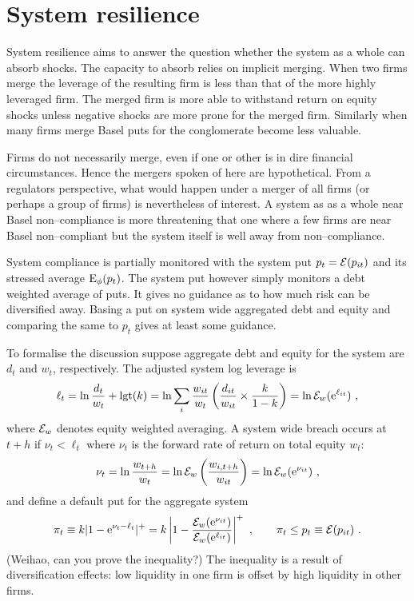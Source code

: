 \documentclass[authoryear]{elsarticle}
\newcommand{\logit}{\mathrm{lgt}}
\newcommand{\e}{\mathrm{e}}
\newcommand{\Ex}{{\cal E}}
\newcommand{\cq}{\ , \qquad}
\newcommand{\be}[1]{\begin{equation}\label{#1}}
\newcommand{\ee}{\end{equation}}
\begin{document}
\section{System resilience}

System resilience aims to answer the question whether the system as a whole can absorb shocks.   The capacity to absorb relies on implicit merging.  When two firms merge the leverage of the resulting firm is less than that of the more highly leveraged firm.   The merged firm is more able to withstand return on equity shocks  unless negative shocks are more prone for the merged firm.   Similarly when many firms merge Basel puts for the conglomerate become less valuable.

Firms do not necessarily merge, even if one or other is in dire financial circumstances.   Hence the mergers spoken of here are hypothetical.   From a regulators perspective, what would happen under a merger of all firms (or perhaps a group of firms) is nevertheless of interest.   A system as as a whole near Basel non--compliance is more threatening that one where a few firms are near Basel non--compliant but the system itself is well away from non--compliance.

System compliance  is partially monitored with the system put $p_t=\Ex(p_{it})$ and its stressed average $\mathrm{E}_\phi(p_t)$.   The system put however simply monitors a debt weighted average of puts.   It gives no guidance as to how much risk can be diversified away.   Basing a put on system wide aggregated debt and equity and comparing the same to $p_t$  gives at least some guidance.

To formalise the discussion suppose aggregate debt and equity for the system are $d_t$ and $w_t$, respectively.      The adjusted system log leverage is  
$$
\ell_t =  \ln \frac{d_t}{w_t} +\logit(k) =  \ln \sum_i\frac{w_{it}}{w_t}\left(\frac{ d_{it}}{ w_{it}}\times \frac{k}{1-k}\right) = \ln \Ex_w(\e^{\ell_{it}}) \ ,
$$
where $\Ex_w$ denotes equity weighted averaging.  A system wide breach occurs at $t+h$ if
$
\nu_t < \ell_t
$
where $\nu_t$ is the forward rate of return on total equity $w_t$:
\be{ew}
 \nu_t = \ln \frac{w_{t+h}}{w_t} = \ln \Ex_w\left(\frac{w_{i,t+h}}{w_{it}}\right) = \ln \Ex_w(\e^{\nu_{it}})\ , 
\ee
and define a default put for the aggregate system 
$$
\pi_t\equiv k|1-\e^{\nu_t-\ell_t}|^+=k\left|1-\frac{\Ex_w(\e^{\nu_{it}})}{\Ex_w(\e^{\ell_{it}})}\right|^+ \cq \pi_t\le p_t\equiv \Ex(p_{it})\ .
$$
(Weihao, can you prove the inequality?)  The inequality is a result  of diversification effects:   low liquidity  in one firm is offset by high liquidity  in other  firms.
\end{document}
